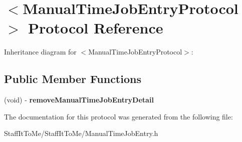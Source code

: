 \hypertarget{protocol_manual_time_job_entry_protocol-p}{
\section{$<$\-Manual\-Time\-Job\-Entry\-Protocol$>$ \-Protocol \-Reference}
\label{protocol_manual_time_job_entry_protocol-p}
}


\-Inheritance diagram for $<$\-Manual\-Time\-Job\-Entry\-Protocol$>$\-:
\subsection*{\-Public \-Member \-Functions}
\begin{DoxyCompactItemize}
\item 
\hypertarget{protocol_manual_time_job_entry_protocol-p_a7c59ac21e1e4232dc9304e5b6a143300}{
(void) -\/ {\bfseries remove\-Manual\-Time\-Job\-Entry\-Detail}}
\label{protocol_manual_time_job_entry_protocol-p_a7c59ac21e1e4232dc9304e5b6a143300}

\end{DoxyCompactItemize}


\-The documentation for this protocol was generated from the following file\-:\begin{DoxyCompactItemize}
\item 
\-Staff\-It\-To\-Me/\-Staff\-It\-To\-Me/\-Manual\-Time\-Job\-Entry.\-h\end{DoxyCompactItemize}
